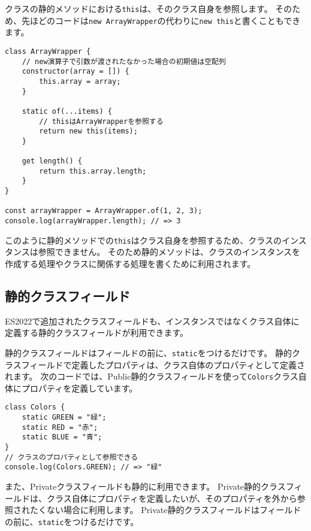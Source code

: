 クラスの静的メソッドにおける\texttt{this}は、そのクラス自身を参照します。
そのため、先ほどのコードは\texttt{new ArrayWrapper}の代わりに\texttt{new this}と書くこともできます。

\begin{lstlisting}
class ArrayWrapper {
    // new演算子で引数が渡されたなかった場合の初期値は空配列
    constructor(array = []) {
        this.array = array;
    }

    static of(...items) {
        // thisはArrayWrapperを参照する
        return new this(items);
    }

    get length() {
        return this.array.length;
    }
}

const arrayWrapper = ArrayWrapper.of(1, 2, 3);
console.log(arrayWrapper.length); // => 3
\end{lstlisting}

このように静的メソッドでの\texttt{this}はクラス自身を参照するため、クラスのインスタンスは参照できません。
そのため静的メソッドは、クラスのインスタンスを作成する処理やクラスに関係する処理を書くために利用されます。

\hypertarget{static-class-fields}{%
\subsection{静的クラスフィールド\,\protect{}}\label{static-class-fields}}

ES2022で追加されたクラスフィールドも、インスタンスではなくクラス自体に定義する静的クラスフィールドが利用できます。

静的クラスフィールドはフィールドの前に、\texttt{static}をつけるだけです。
静的クラスフィールドで定義したプロパティは、クラス自体のプロパティとして定義されます。
次のコードでは、Public静的クラスフィールドを使って\texttt{Colors}クラス自体にプロパティを定義しています。

\begin{lstlisting}
class Colors {
    static GREEN = "緑";
    static RED = "赤";
    static BLUE = "青";
}
// クラスのプロパティとして参照できる
console.log(Colors.GREEN); // => "緑"
\end{lstlisting}

また、Privateクラスフィールドも静的に利用できます。
Private静的クラスフィールドは、クラス自体にプロパティを定義したいが、そのプロパティを外から参照されたくない場合に利用します。
Private静的クラスフィールドはフィールドの前に、\texttt{static}をつけるだけです。


